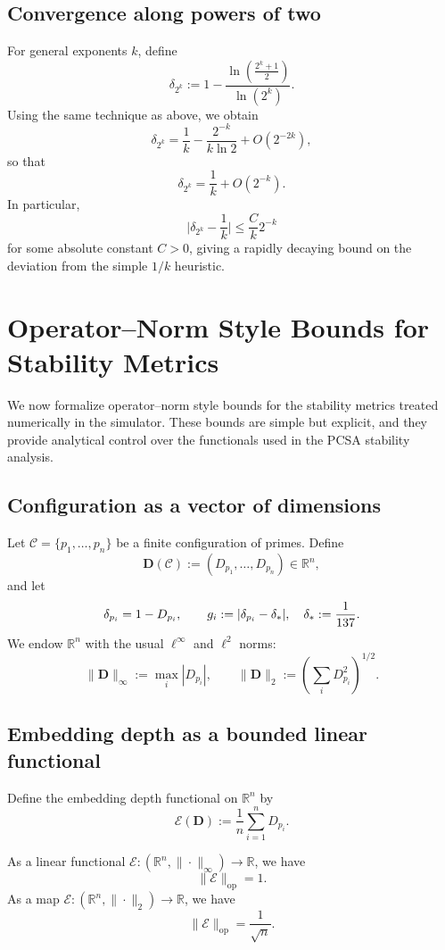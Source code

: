 \documentclass[11pt]{article}
\begin{document}
\subsection{Convergence along powers of two}

For general exponents \(k\), define
\[
  \delta_{2^k} := 1 - \frac{\ln\left(\frac{2^{k}+1}{2}\right)}{\ln(2^k)}.
\]
Using the same technique as above, we obtain
\[
  \delta_{2^k}
   = \frac{1}{k} - \frac{2^{-k}}{k\ln 2} + O(2^{-2k}),
\]
so that
\[
  \delta_{2^k} = \frac{1}{k} + O(2^{-k}).
\]
In particular,
\[
  \biggl|\delta_{2^k} - \frac{1}{k}\biggr| \le \frac{C}{k} 2^{-k}
\]
for some absolute constant \(C>0\), giving a rapidly decaying bound on the deviation from the simple \(1/k\) heuristic.

\section{Operator–Norm Style Bounds for Stability Metrics}

We now formalize operator–norm style bounds for the stability metrics treated numerically in the simulator. These bounds are simple but explicit, and they provide analytical control over the functionals used in the PCSA stability analysis.

\subsection{Configuration as a vector of dimensions}

Let \(\mathcal{C} = \{p_1,\dots,p_n\}\) be a finite configuration of primes. Define
\[
  \mathbf{D}(\mathcal{C}) := (D_{p_1},\dots,D_{p_n}) \in \mathbb{R}^n,
\]
and let
\[
  \delta_{p_i} = 1 - D_{p_i}, \qquad
  g_i := \abs{\delta_{p_i} - \delta_\ast}, \quad \delta_\ast := \frac{1}{137}.
\]
We endow \(\mathbb{R}^n\) with the usual \(\ell^\infty\) and \(\ell^2\) norms:
\[
  \|\mathbf{D}\|_\infty := \max_i |D_{p_i}|, \qquad
  \|\mathbf{D}\|_2 := \left(\sum_i D_{p_i}^2\right)^{1/2}.
\]

\subsection{Embedding depth as a bounded linear functional}

Define the embedding depth functional on \(\mathbb{R}^n\) by
\[
  \mathcal{E}(\mathbf{D}) := \frac{1}{n}\sum_{i=1}^n D_{p_i}.
\]

\begin{lemma}
As a linear functional \(\mathcal{E}\colon (\mathbb{R}^n,\|\cdot\|_\infty)\to\mathbb{R}\), we have
\[
  \|\mathcal{E}\|_{\mathrm{op}} = 1.
\]
As a map \(\mathcal{E}\colon (\mathbb{R}^n,\|\cdot\|_2)\to\mathbb{R}\), we have
\[
  \|\mathcal{E}\|_{\mathrm{op}} = \frac{1}{\sqrt{n}}.
\]
\end{lemma}
\end{document}
